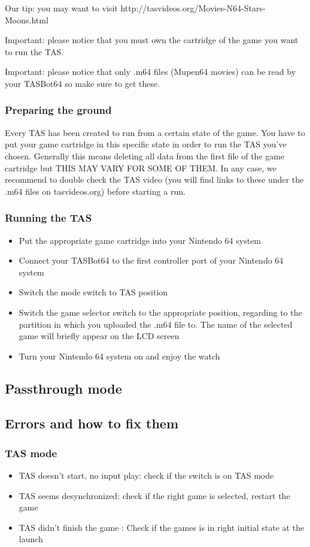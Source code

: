\documentclass[a4paper,oneside,12pt]{article}
\begin{document}
Our tip: you may want to visit http://tasvideos.org/Movies-N64-Stars-Moons.html

Important: please notice that you must own the cartridge of the game you want 
to run the TAS.

Important: please notice that only .m64 files (Mupen64 movies) can be read by 
your TASBot64 so make sure to get these.

\subsubsection{Preparing the ground}
Every TAS has been created to run from a certain state of the game. You have to 
put your game cartridge in this specific state in order to run the TAS you've 
chosen. Generally this means deleting all data from the first file of the game 
cartridge but THIS MAY VARY FOR SOME OF THEM. In any case, we recommend to 
double check the TAS video (you will find links to these under the .m64 files 
on tasvideos.org) before starting a run.

\subsubsection{Running the TAS}
\begin{itemize}
\item Put the appropriate game cartridge into your Nintendo 64 system
\item Connect your TASBot64 to the first controller port of your Nintendo 64 
system
\item Switch the mode switch to TAS position
\item Switch the game selector switch to the appropriate position, regarding to 
the partition in which you uploaded the .m64 file to. The name of the selected 
game will briefly appear on the LCD screen
\item Turn your Nintendo 64 system on and enjoy the watch
\end{itemize}

\subsection{Passthrough mode}

\subsection{Errors and how to fix them}
\subsubsection{TAS mode}
\begin{itemize}
\item TAS doesn't start, no input play: check if the switch is on TAS mode
\item TAS seems desynchronized: check if the right game is selected, restart 
the game
\item TAS didn't finish the game : Check if the games is in right initial state 
at the launch
\end{itemize}
\end{document}
